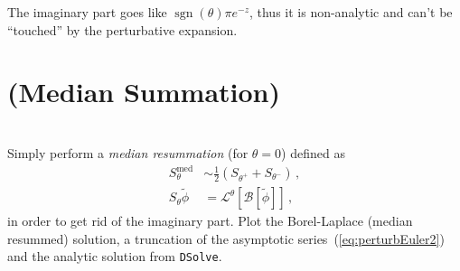 \documentclass{exam}
\DeclareMathOperator{\sign}{sgn}
\newcommand{\calB}{\mathcal{B}}
\newcommand{\calL}{\mathcal{L}}
\begin{document}
\begin{questions}
\begin{parts}
        The imaginary part goes like $\sign(\theta) \pi e^{-z}$, thus it is non-analytic
        and can't be ``touched'' by the perturbative expansion.

        \part{ (\textbf{Median Summation})}\\
        Simply perform a \emph{median resummation} (for $\theta = 0$) defined as
        \begin{align*}
            S^\text{med}_\theta &\sim \frac{1}{2}(S_{\theta^+} + S_{\theta^-})\,,\\
            S_\theta \tilde{\phi} &= \calL^\theta[\calB[\tilde{\phi}]]\,,
        \end{align*}
        in order to get rid of the imaginary part.
        Plot the Borel-Laplace (median resummed) solution, a truncation of the asymptotic series~(\ref{eq:perturbEuler2})
        and the analytic solution from \verb!DSolve!.
        
    \end{parts}

    
\end{questions}
\end{document}
